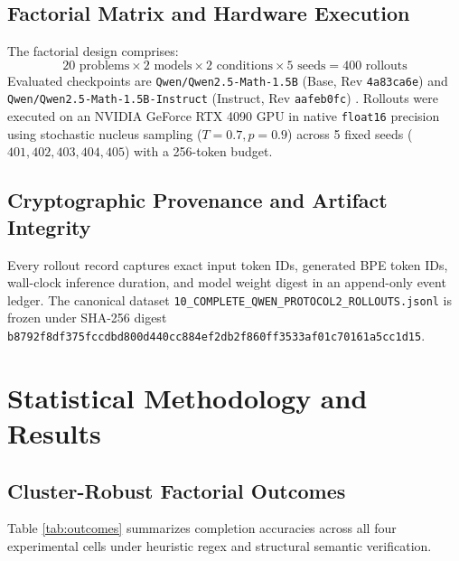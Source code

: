 \documentclass[10pt,conference]{IEEEtran}
\begin{document}
\subsection{Factorial Matrix and Hardware Execution}
The factorial design comprises:
$$20 \text{ problems} \times 2 \text{ models} \times 2 \text{ conditions} \times 5 \text{ seeds} = 400 \text{ rollouts}$$
Evaluated checkpoints are \texttt{Qwen/Qwen2.5-Math-1.5B} (Base, Rev \texttt{4a83ca6e}) and \texttt{Qwen/Qwen2.5-Math-1.5B-Instruct} (Instruct, Rev \texttt{aafeb0fc}) \cite{qwen25math2024}. Rollouts were executed on an NVIDIA GeForce RTX 4090 GPU in native \texttt{float16} precision using stochastic nucleus sampling ($T=0.7, p=0.9$) across 5 fixed seeds ($401, 402, 403, 404, 405$) with a 256-token budget.

\subsection{Cryptographic Provenance and Artifact Integrity}
Every rollout record captures exact input token IDs, generated BPE token IDs, wall-clock inference duration, and model weight digest in an append-only event ledger. The canonical dataset \texttt{10\_COMPLETE\_QWEN\_PROTOCOL2\_ROLLOUTS.jsonl} is frozen under SHA-256 digest \texttt{b8792f8df375fccdbd800d440cc884ef\allowbreak 2db2f860ff3533af01c70161a5cc1d15}.

\section{Statistical Methodology and Results}

\subsection{Cluster-Robust Factorial Outcomes}
Table \ref{tab:outcomes} summarizes completion accuracies across all four experimental cells under heuristic regex and structural semantic verification.
\end{document}

